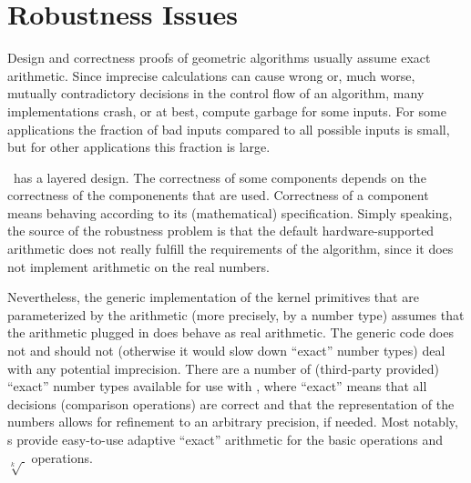 
\chapter{Robustness Issues\label{chap:robustness}}

Design and correctness proofs of geometric algorithms usually assume exact
arithmetic. Since imprecise calculations can cause wrong or, much worse,
mutually contradictory decisions in the control flow of an algorithm, many
implementations crash, or at best, compute garbage for some inputs. For
some applications the fraction of bad inputs compared to all possible
inputs is small, but for other applications this fraction is large.

\cgal\ has a layered design. The correctness of some components depends
on the correctness of the componenents that are used. Correctness of
a component means behaving according to its (mathematical) specification.
Simply speaking, the source of the robustness problem is that the default
hardware-supported arithmetic does not really fulfill the requirements of 
the algorithm, since it does not implement arithmetic on the real numbers.

Nevertheless, the generic implementation of the kernel primitives that are 
parameterized by the arithmetic (more precisely, by a number type)
assumes that the arithmetic plugged in does behave as real arithmetic.
The generic code does not and should not (otherwise it would slow down 
``exact'' number types) deal with any potential imprecision. There are
a number of (third-party provided) ``exact'' number types available for use
with \cgal, where ``exact'' means
that all decisions (comparison operations) are correct and that the
representation of the numbers allows for refinement to an arbitrary precision, 
if needed. Most notably, s provide easy-to-use adaptive 
``exact'' arithmetic for the basic operations and $\sqrt[k]{\ }$ operations.


